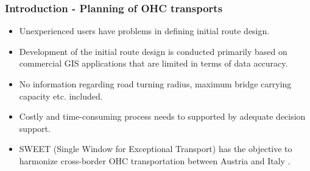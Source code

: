 \documentclass{beamer}   %
\newcommand{\RNum}[1]{\uppercase\expandafter{\romannumeral #1\relax}}
\theoremstyle{break}
\begin{document}
  \begin{frame}
    \frametitle{Introduction \RNum{5} - Planning of OHC transports}
    \begin{itemize}
      	\item Unexperienced users have problems in defining initial route design. 
	\item Development of the initial route design is conducted primarily based on commercial GIS applications that are limited in terms of data accuracy.
	\item No information regarding road turning radius, maximum bridge carrying capacity etc. included. 
	\item Costly and time-consuming process needs to supported by adequate decision support. 
	\item SWEET (Single Window for Exceptional Transport) has the objective to harmonize cross-border OHC transportation between Austria and Italy \cite{Sweet}.
    \end{itemize}
 \end{frame}

 




\end{document}
